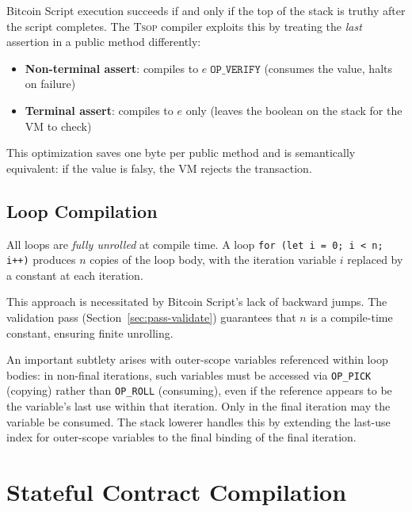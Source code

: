 \documentclass[11pt,a4paper]{article}
\newcommand{\op}[1]{\texttt{OP\_#1}}
\newcommand{\tsop}{\textsc{Tsop}}
\begin{document}
Bitcoin Script execution succeeds if and only if the top of the stack is
truthy after the script completes. The \tsop{} compiler exploits this by
treating the \emph{last} assertion in a public method differently:

\begin{itemize}[nosep]
  \item \textbf{Non-terminal assert}: compiles to $e\; \op{VERIFY}$
    (consumes the value, halts on failure)
  \item \textbf{Terminal assert}: compiles to $e$ only (leaves the
    boolean on the stack for the VM to check)
\end{itemize}

This optimization saves one byte per public method and is semantically
equivalent: if the value is falsy, the VM rejects the transaction.

\subsection{Loop Compilation}
\label{sec:codegen-loops}

All loops are \emph{fully unrolled} at compile time. A loop
\texttt{for (let i = 0; i < n; i++)} produces $n$ copies of the loop body,
with the iteration variable $i$ replaced by a constant at each iteration.

This approach is necessitated by Bitcoin Script's lack of backward jumps.
The validation pass (Section~\ref{sec:pass-validate}) guarantees that $n$ is
a compile-time constant, ensuring finite unrolling.

An important subtlety arises with outer-scope variables referenced within
loop bodies: in non-final iterations, such variables must be accessed via
\op{PICK} (copying) rather than \op{ROLL} (consuming), even if the reference
appears to be the variable's last use within that iteration. Only in the
final iteration may the variable be consumed. The stack lowerer handles this
by extending the last-use index for outer-scope variables to the final
binding of the final iteration.

\section{Stateful Contract Compilation}
\label{sec:stateful}
\end{document}
